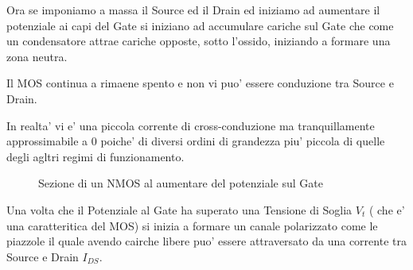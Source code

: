 \documentclass[\main/main.tex]{subfiles}
\begin{document}
Ora se imponiamo a massa il Source ed il Drain ed iniziamo ad aumentare il potenziale ai capi del Gate si iniziano ad accumulare cariche sul Gate che come un condensatore attrae cariche opposte, sotto l'ossido, iniziando a formare una zona neutra.

Il MOS continua a rimaene spento e non vi puo' essere conduzione tra Source e Drain.

In realta' vi e' una piccola corrente di cross-conduzione ma tranquillamente approssimabile a 0 poiche' di diversi ordini di grandezza piu' piccola di quelle degli agltri regimi di funzionamento.

\begin{figure}[H]
\center
{}
\caption{Sezione di un NMOS al aumentare del potenziale sul Gate}
\end{figure}

Una volta che il Potenziale al Gate ha superato una Tensione di Soglia $V_t$ ( che e' una caratteritica del MOS) si inizia a formare un canale polarizzato come le piazzole il quale avendo cairche libere puo' essere attraversato da una corrente tra Source e Drain $I_{DS}$.
\end{document}
